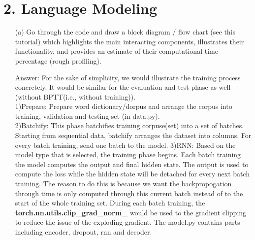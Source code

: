 \documentclass[12pt,letterpaper]{article}
\begin{document}
\section*{2. Language Modeling}
\begin{itemize}
    \item[(a)]Go through the code and draw a block diagram / flow chart (see this tutorial) which highlights the main interacting components, illustrates their functionality, and provides an estimate of their computational time percentage (rough profiling).
    
    Answer: 
    For the sake of simplicity, we would illustrate the training process concretely. It would be similar for the evaluation and test phase as well (without BPTT(i.e., without training)).\\
    1)Prepare: Prepare word dictionary/dorpus and arrange the corpus into training, validation and testing set (in data.py).\\
    2)Batchify: This phase batchifies training corpuse(set) into a set of batches. Starting from sequential data, batchify arranges the dataset into columns. For every batch training, send one batch to the model.
    3)RNN: Based on the model type that is selected, the training phase begins. Each batch training the model computes the output and final hidden state. The output is used to compute the loss while the hidden state will be detached for every next batch training. The reason to do this is because we want the backpropogation through time is only computed through this current batch instead of to the start of the whole training set. During each batch training, the \textbf{torch.nn.utils.clip\_grad\_norm\_} would be used to the gradient clipping to reduce the issue of the exploding gradient. The model.py contains parts including encoder, dropout, rnn and decoder. 
    
\end{itemize}
\end{document}
